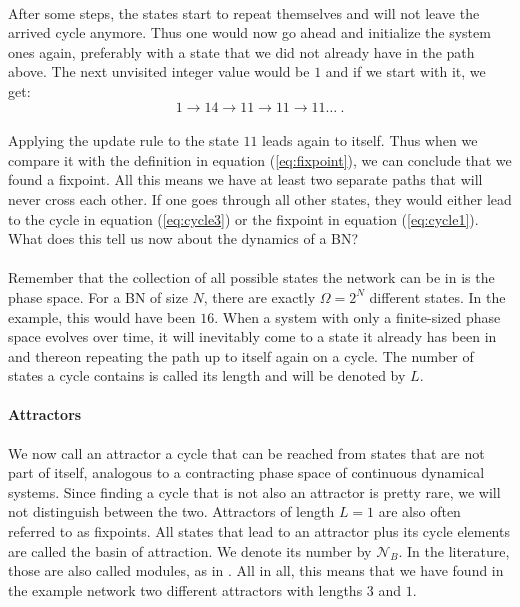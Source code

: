 \paragraph*{}
After some steps, the states start to repeat themselves and will not leave the arrived cycle anymore. Thus one would now go ahead and initialize the system ones again, preferably with a state that we did not already have in the path above. The next unvisited integer value would be $1$ and if we start with it, we get:
\begin{equation}\label{eq:cycle1}
1 \rightarrow 14 \rightarrow 11 \rightarrow 11 \rightarrow 11 \dots\ .
\end{equation}

\paragraph*{}
Applying the update rule to the state $11$ leads again to itself. Thus when we compare it with the definition in equation (\ref{eq:fixpoint}), we can conclude that we found a fixpoint. All this means we have at least two separate paths that will never cross each other. If one goes through all other states, they would either lead to the cycle in equation (\ref{eq:cycle3}) or the fixpoint in equation (\ref{eq:cycle1}). What does this tell us now about the dynamics of a BN?

\paragraph*{}
Remember that the collection of all possible states the network can be in is the phase space. For a BN of size $ N $, there are exactly $ \Omega = 2^N $ different states. In the example, this would have been $16$. When a system with only a finite-sized phase space evolves over time, it will inevitably come to a state it already has been in and thereon repeating the path up to itself again on a cycle. The number of states a cycle contains is called its length and will be denoted by $ L $. 

\paragraph*{Attractors}
We now call an attractor a cycle that can be reached from states that are not part of itself, analogous to a contracting phase space of continuous dynamical systems. Since finding a cycle that is not also an attractor is pretty rare, we will not distinguish between the two. Attractors of length $ L=1 $ are also often referred to as fixpoints. All states that lead to an attractor plus its cycle elements are called the basin of attraction. We denote its number by $ \mathcal{N}_B $. In the literature, those are also called modules, as in \cite{aldana2003boolean}. All in all, this means that we have found in the example network two different attractors with lengths $3$ and $1$.


